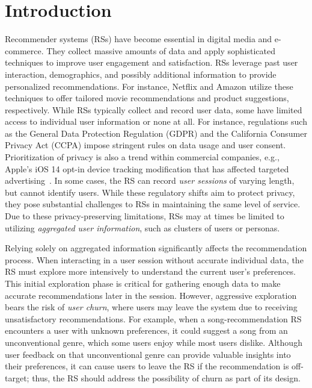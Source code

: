 \section{Introduction}

Recommender systems (RSs) have become essential in digital media and e-commerce. They collect massive amounts of data and apply sophisticated techniques to improve user engagement and satisfaction. RSs leverage past user interaction, demographics, and possibly additional information to provide personalized recommendations. For instance, Netflix and Amazon utilize these techniques to offer tailored movie recommendations and product suggestions, respectively. While RSs typically collect and record user data, some have limited access to individual user information or none at all. For instance, regulations such as the General Data Protection Regulation (GDPR) and the California Consumer Privacy Act (CCPA) impose stringent rules on data usage and user consent. Prioritization of privacy is also a trend within commercial companies, e.g., Apple's iOS 14 opt-in device tracking modification that has affected targeted advertising~\cite{kollnig2022goodbye}. In some cases, the RS can record \emph{user sessions} of varying length, but cannot identify users. While these regulatory shifts aim to protect privacy, they pose substantial challenges to RSs in maintaining the same level of service. Due to these privacy-preserving limitations, RSs may at times be limited to utilizing \emph{aggregated user information}, such as clusters of users or personas.

Relying solely on aggregated information significantly affects the recommendation process. When interacting in a user session without accurate individual data, the RS must explore more intensively to understand the current user's preferences. This initial exploration phase is critical for gathering enough data to make accurate recommendations later in the session. However, aggressive exploration bears the risk of \emph{user churn}, where users may leave the system due to receiving unsatisfactory recommendations. For example, when a song-recommendation RS encounters a user with unknown preferences, it could suggest a song from an unconventional genre, which some users enjoy while most users dislike. Although user feedback on that unconventional genre can provide valuable insights into their preferences, it can cause users to leave the RS if the recommendation is off-target; thus, the RS should address the possibility of churn as part of its design.

